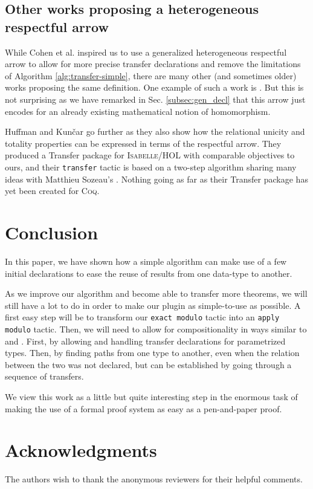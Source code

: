 \documentclass{llncs}
\begin{document}
\subsection{Other works proposing a heterogeneous respectful arrow}

While Cohen et al. \cite{Cohen2013} inspired us to use a
generalized heterogeneous respectful arrow to allow for more precise
transfer declarations and remove the limitations of Algorithm
\ref{alg:transfer-simple},
there are many other (and sometimes older) works proposing
the same definition.
One example of such a work is \cite[Def. 13]{homeier2005design}.
But this is not surprising as we have remarked in Sec. \ref{subsec:gen_decl}
that this arrow just encodes for an already existing mathematical
notion of homomorphism.

Huffman and Kun\v{c}ar \cite{huffman2013lifting} go further as
they also show how the relational unicity and totality properties
can be expressed in terms of the respectful arrow.
They produced a Transfer package for \textsc{Isabelle/HOL} with
comparable objectives to ours, and their \texttt{transfer} tactic
is based on a two-step algorithm
sharing many ideas with Matthieu Sozeau's \cite{Sozeau2010}.
Nothing going as far as their Transfer package has yet been
created for \textsc{Coq}.

\section{Conclusion}

In this paper, we have shown how a simple algorithm can make use of a
few initial declarations to ease the reuse of results from one data-type
to another.

As we improve our algorithm and become able to transfer more theorems,
we will still have a lot to do in order to make our plugin as simple-to-use
as possible.
A first easy step will be to transform our \texttt{exact modulo} tactic
into an \texttt{apply modulo} tactic.
Then, we will need to allow for compositionality
in ways similar to \cite{Cohen2013} and \cite{huffman2013lifting}.
First, by allowing
and handling transfer declarations for parametrized types. Then,
by finding paths from one type to another, even when the relation
between the two was not declared, but can be established by going through
a sequence of transfers.

We view this work as a little but quite interesting step in the enormous task
of making the use of a formal proof system as easy as a
pen-and-paper proof.

\section*{Acknowledgments}

The authors wish to thank the anonymous reviewers for their helpful comments.



\end{document}
